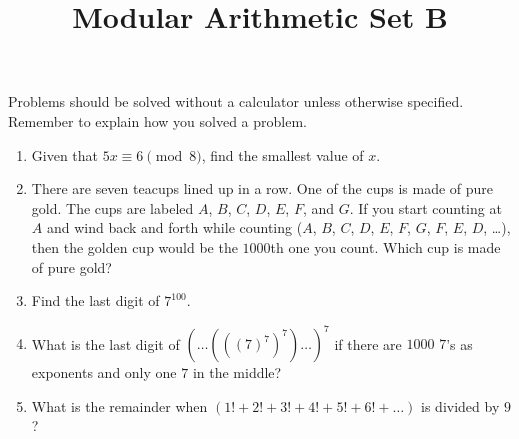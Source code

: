\documentclass{article}
\title{Modular Arithmetic Set B}
\date{}
\author{}
\begin{document}
\maketitle
\noindent Problems should be solved without a calculator unless otherwise specified.
Remember to explain how you solved a problem.
\begin{multicols}{2}
    \raggedcolumns
    \begin{enumerate}
        \item Given that $5x \equiv 6 \pmod 8$, find the smallest value of $x$.
            \vspace{3cm}
        \item There are seven teacups lined up in a row.
            One of the cups is made of pure gold.
            The cups are labeled $A$, $B$, $C$, $D$, $E$, $F$, and $G$.
            If you start counting at $A$ and wind back and forth while counting ($A$, $B$, $C$, $D$, $E$, $F$, $G$, $F$, $E$, $D$, \dots), then the golden cup would be the $1000$th one you count.
            Which cup is made of pure gold?
            \vspace{3cm}
        \item Find the last digit of $7^{100}$.
            \vspace{3cm}
        \item What is the last digit of $(\dots(((7)^7)^7)\dots)^7$ if there are $1000$ $7$'s as exponents and only one $7$ in the middle?
            \vspace{3cm}
        \item What is the remainder when $(1! + 2! + 3! + 4! + 5! + 6! + \dots)$ is divided by $9$?
            \vspace{3cm}
    \end{enumerate}
\end{multicols}
\end{document}
